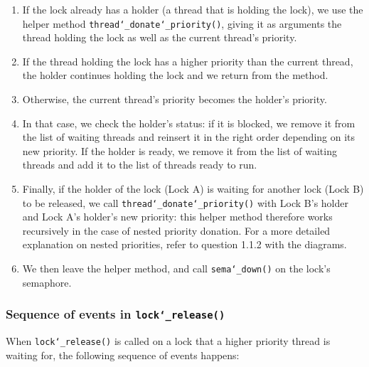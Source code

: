 \documentclass{article}
\renewcommand{\_}{\char`_}
\begin{document}
\begin{enumerate}

\item If the lock already has a holder (a thread that is holding the lock), we use the helper method \texttt{thread\_donate\_priority()}, giving it as arguments the thread holding the lock as well as the current thread's priority.

\item If the thread holding the lock has a higher priority than the current thread, the holder continues holding the lock and we return from the method.

\item Otherwise, the current thread's priority becomes the holder's priority.

\item In that case, we check the holder's status: if it is blocked, we remove it from the list of waiting threads and reinsert it in the right order depending on its new priority. If the holder is ready, we remove it from the list of waiting threads and add it to the list of threads ready to run.

\item Finally, if the holder of the lock (Lock A) is waiting for another lock (Lock B) to be released, we call \texttt{thread\_donate\_priority()} with Lock B's holder and Lock A's holder's new priority: this helper method therefore works recursively in the case of nested priority donation. For a more detailed explanation on nested priorities, refer to question 1.1.2 with the diagrams.

\item We then leave the helper method, and call \texttt{sema\_down()} on the lock's semaphore.

\end{enumerate}

\subsubsection{Sequence of events in \texttt{lock\_release()}}

When \texttt{lock\_release()} is called on a lock that a higher priority thread is waiting for, the following sequence of events happens:
\end{document}
